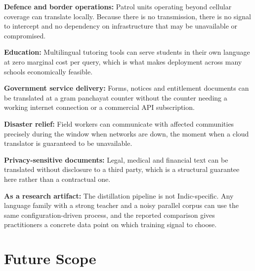 \textbf{Defence and border operations:} Patrol units operating beyond cellular
coverage can translate locally. Because there is no transmission, there is no
signal to intercept and no dependency on infrastructure that may be unavailable
or compromised.

\textbf{Education:} Multilingual tutoring tools can serve students in their own
language at zero marginal cost per query, which is what makes deployment across
many schools economically feasible.

\textbf{Government service delivery:} Forms, notices and entitlement documents
can be translated at a gram panchayat counter without the counter needing a
working internet connection or a commercial API subscription.

\textbf{Disaster relief:} Field workers can communicate with affected
communities precisely during the window when networks are down, the moment
when a cloud translator is guaranteed to be unavailable.

\textbf{Privacy-sensitive documents:} Legal, medical and financial text can be
translated without disclosure to a third party, which is a structural guarantee
here rather than a contractual one.

\textbf{As a research artifact:} The distillation pipeline is not
Indic-specific. Any language family with a strong teacher and a noisy parallel
corpus can use the same configuration-driven process, and the reported
comparison gives practitioners a concrete data point on which training signal to
choose.

\section{Future Scope}
\label{sec:future}

